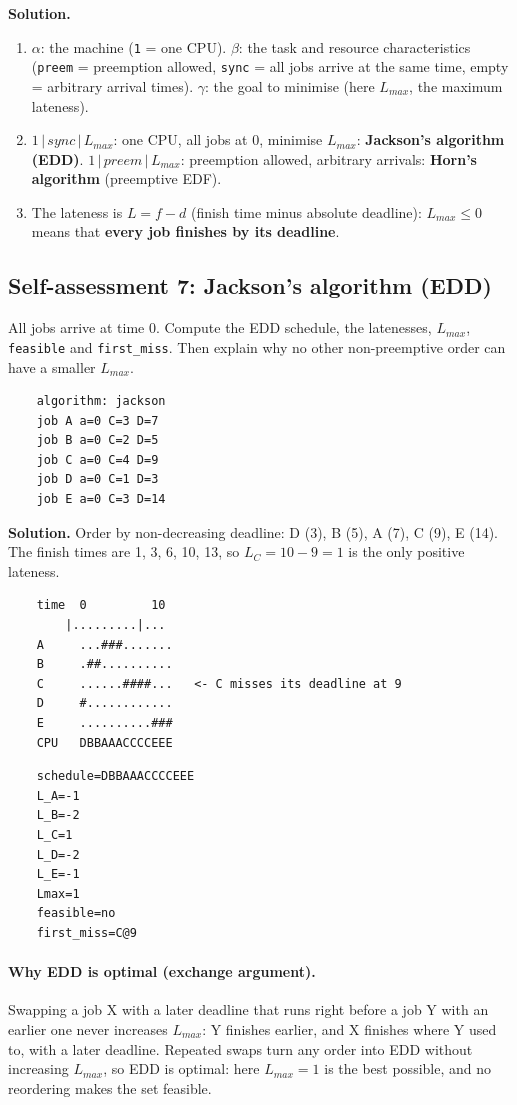 \textbf{Solution.}
\begin{enumerate}
    \item $\alpha$: the machine (\texttt{1} = one CPU). $\beta$: the task and resource characteristics (\texttt{preem} = preemption allowed, \texttt{sync} = all jobs arrive at the same time, empty = arbitrary arrival times). $\gamma$: the goal to minimise (here $L_{max}$, the maximum lateness).
    \item $1 \,|\, \textit{sync} \,|\, L_{max}$: one CPU, all jobs at 0, minimise $L_{max}$: \textbf{Jackson's algorithm (EDD)}. $1 \,|\, \textit{preem} \,|\, L_{max}$: preemption allowed, arbitrary arrivals: \textbf{Horn's algorithm} (preemptive EDF).
    \item The lateness is $L = f - d$ (finish time minus absolute deadline): $L_{max} \le 0$ means that \textbf{every job finishes by its deadline}.
\end{enumerate}

\subsection*{Self-assessment 7: Jackson's algorithm (EDD)}
All jobs arrive at time 0. Compute the EDD schedule, the latenesses, $L_{max}$, \texttt{feasible} and \texttt{first\_miss}. Then explain why no other non-preemptive order can have a smaller $L_{max}$.
\begin{lstlisting}
    algorithm: jackson
    job A a=0 C=3 D=7
    job B a=0 C=2 D=5
    job C a=0 C=4 D=9
    job D a=0 C=1 D=3
    job E a=0 C=3 D=14
\end{lstlisting}

\textbf{Solution.} Order by non-decreasing deadline: D (3), B (5), A (7), C (9), E (14). The finish times are 1, 3, 6, 10, 13, so $L_C = 10 - 9 = 1$ is the only positive lateness.
\begin{verbatim}
    time  0         10
        |.........|...
    A     ...###.......
    B     .##..........
    C     ......####...   <- C misses its deadline at 9
    D     #............
    E     ..........###
    CPU   DBBAAACCCCEEE
\end{verbatim}
\begin{verbatim}
    schedule=DBBAAACCCCEEE
    L_A=-1
    L_B=-2
    L_C=1
    L_D=-2
    L_E=-1
    Lmax=1
    feasible=no
    first_miss=C@9
\end{verbatim}
\paragraph*{Why EDD is optimal (exchange argument).} Swapping a job X with a later deadline that runs right before a job Y with an earlier one never increases $L_{max}$: Y finishes earlier, and X finishes where Y used to, with a later deadline. Repeated swaps turn any order into EDD without increasing $L_{max}$, so EDD is optimal: here $L_{max} = 1$ is the best possible, and no reordering makes the set feasible.

